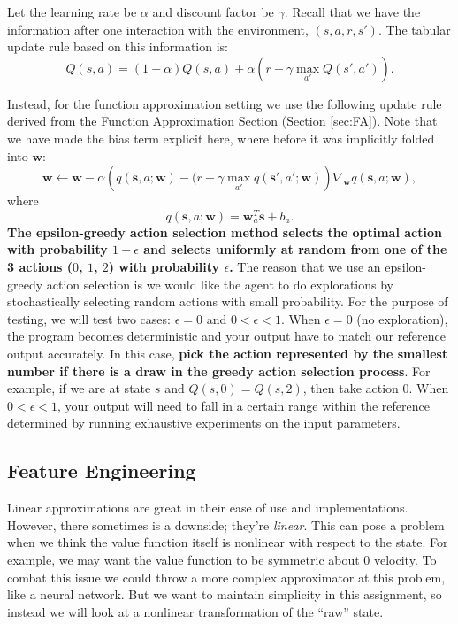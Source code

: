 \documentclass[11pt,addpoints,answers]{exam}
\newcommand{\sv}{\mathbf{s}}
\newcommand{\wv}{\mathbf{w}}
\begin{document}
Let the learning rate be $\alpha$ and discount factor be $\gamma$. Recall that we have the information after one interaction with the environment, $(s, a, r, s')$. The tabular update rule based on this information is: 
\[
    Q(s,a) = (1 - \alpha) Q(s, a) + \alpha \left(r + \gamma \max_{a'} Q(s', a')\right).
\]

Instead, for the function approximation setting we use the following update rule derived from the Function Approximation Section (Section \ref{sec:FA}). Note that we have made the bias term explicit here, where before it was implicitly folded into $\wv$:
\[
\wv \leftarrow \wv - \alpha \left(q(\sv, a; \wv) - (r + \gamma \max_{a'} q(\sv', a'; \wv)\right) \nabla_\wv q(\sv, a; \wv),
\]
where
\[
q(\sv,a;\wv) = \wv_a^T \sv + b_a.
\]
\textbf{The epsilon-greedy action selection method selects the optimal action with probability $1 - \epsilon$ and selects uniformly at random from one of the 3 actions ($0$, $1$, $2$) with probability $\epsilon$.} The reason that we use an epsilon-greedy action selection is we would like the agent to do explorations by stochastically selecting random actions with small probability. For the purpose of testing, we will test two cases: $\epsilon = 0$ and $0 < \epsilon < 1$. When $\epsilon = 0$ (no exploration), the program becomes deterministic and your output have to match our reference output accurately. In this case, \textbf{pick the action represented by the smallest number if there is a draw in the greedy action selection process}. For example, if we are at state $s$ and $Q(s, 0) = Q(s, 2)$, then take action $0$. When $0 < \epsilon < 1$, your output will need to fall in a certain range within the reference determined by running exhaustive experiments on the input parameters.


\subsection{Feature Engineering}
Linear approximations are great in their ease of use and implementations. However, there sometimes is a downside; they're \emph{linear}. This can pose a problem when we think the value function itself is nonlinear with respect to the state. For example, we may want the value function to be symmetric about 0 velocity. To combat this issue we could throw a more complex approximator at this problem, like a neural network. But we want to maintain simplicity in this assignment, so instead we will look at a nonlinear transformation of the ``raw'' state.
\end{document}
